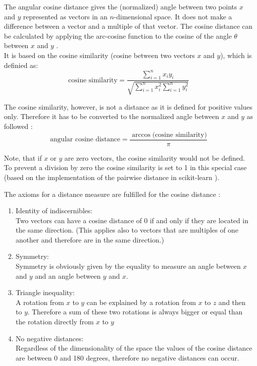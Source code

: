 \marginnote{\textcolor{blue}{Jonas Elpelt}}
The angular cosine distance gives the (normalized) angle between two points $x$ and $y$ represented as vectors in an $n$-dimensional space. It does not make a difference between a vector and a multiple of that vector. The cosine distance can be calculated by applying the arc-cosine function to the cosine of the angle $\theta$ between $x$ and $y$ \cite{MMDS}. \\
It is based on the cosine similarity (cosine between two vectors $x$ and $y$), which is definied as: \\

\begin{equation}
	\text{cosine similarity} = \frac{\sum_{i=1}^{n} x_i y_i}{\sqrt{\sum_{i=1}^{n} x_i^2 \sum_{i=1}^{n} y_i^2}}
\end{equation}  

The cosine similarity, however, is not a distance as it is defined for positive values only. Therefore it has to be converted to the normalized angle between $x$ and $y$ as followed \cite{cosdist}: \\

\begin{equation}
	\text{angular cosine distance} = \frac{\arccos({\text{cosine similarity})}}{\pi}
\end{equation}  

Note, that if $x$ or $y$ are zero vectors, the cosine similarity would not be defined. To prevent a division by zero the cosine similarity is set to 1 in this special case (based on the implementation of the pairwise distance in scikit-learn \cite{scikitlearn}). 

The axioms for a distance measure are fulfilled for the cosine distance \cite{MMDS}: \\

\begin{enumerate}
	\item Identity of indiscernibles:\\
	Two vectors can have a cosine distance of 0 if and only if they are located in the same direction. (This applies also to vectors that are multiples of one another and therefore are in the same direction.) 
	\item Symmetry: \\
	Symmetry is obviously given by the equality to measure an angle between $x$ and $y$ and an angle between $y$ and $x$. 
	\item Triangle inequality: \\
	A rotation from $x$ to $y$ can be explained by a rotation from $x$ to $z$ and then to $y$. Therefore a sum of these two rotations is always bigger or equal than the rotation directly from $x$ to $y$ 
	\item No negative distances:\\
	Regardless of the dimensionality of the space the values of the cosine distance are between 0 and 180 degrees, therefore no negative distances can occur. 
	
\end{enumerate}

